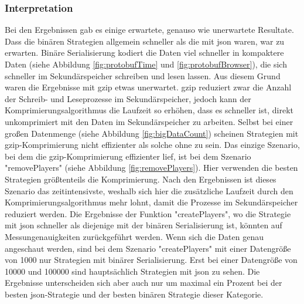 \subsubsection{Interpretation}
Bei den Ergebnissen gab es einige erwartete, genauso wie unerwartete Resultate. Dass die binären Strategien allgemein schneller als die mit \ac{json} waren, war zu erwarten. Binäre Serialisierung kodiert die Daten viel schneller in kompaktere Daten (siehe Abbildung \ref{fig:protobufTime} und \ref{fig:protobufBrowser}), die sich schneller im Sekundärspeicher schreiben und lesen lassen. Aus diesem Grund waren die Ergebnisse mit \ac{gzip} etwas unerwartet. \ac{gzip} reduziert zwar die Anzahl der Schreib- und Leseprozesse im Sekundärspeicher, jedoch kann der Komprimierungsalgorithmus die Laufzeit so erhöhen, dass es schneller ist, direkt unkomprimiert mit den Daten im Sekundärspeicher zu arbeiten. Selbst bei einer großen Datenmenge (siehe Abbildung \ref{fig:bigDataCount}) scheinen Strategien mit \ac{gzip}-Komprimierung nicht effizienter als solche ohne zu sein. Das einzige Szenario, bei dem die \ac{gzip}-Komprimierung effizienter lief, ist bei dem Szenario "removePlayers" (siehe Abbildung \ref{fig:removePlayers}). Hier verwenden die besten Strategien größtenteils die Komprimierung. Nach den Ergebnissen ist dieses Szenario das zeitintensivste, weshalb sich hier die zusätzliche Laufzeit durch den Komprimierungsalgorithmus mehr lohnt, damit die Prozesse im Sekundärspeicher reduziert werden. Die Ergebnisse der Funktion "createPlayers", wo die Strategie mit \ac{json} schneller als diejenige mit der binären Serialisierung ist, könnten auf Messungenauigkeiten zurückgeführt werden. Wenn sich die Daten genau angeschaut werden, sind bei dem Szenario "createPlayers" mit einer Datengröße von 1000 nur Strategien mit binärer Serialisierung. Erst bei einer Datengröße von 10000 und 100000 sind hauptsächlich Strategien mit \ac{json} zu sehen. Die Ergebnisse unterscheiden sich aber auch nur um maximal ein Prozent bei der besten \ac{json}-Strategie und der besten binären Strategie dieser Kategorie.

